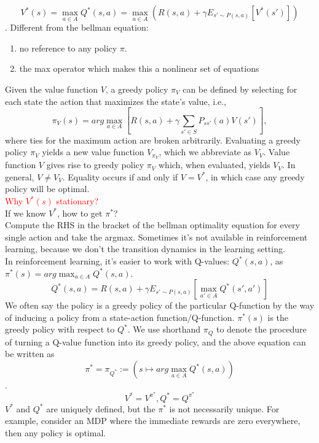 \documentclass{report}
\begin{document}
\begin{equation}\label{eq3}
    V^*(s)=\max_{a\in A}Q^*(s,a)=\max_{a\in A}(R(s,a)+\gamma E_{s'\sim P(s,a)}[V^*(s')])
\end{equation}
. Different from the bellman equation:
\begin{enumerate}
    \item no reference to any policy $\pi$.
    \item the max operator which makes this a nonlinear set of equations
\end{enumerate}
Given the value function $V$, a greedy policy $\pi_{V}$ can be defined by selecting for each state the action that maximizes the state's value, i.e.,\[
\pi_{V}(s)=arg\max_{a\in A}[R(s,a)+\gamma \sum_{s' \in S}P_{ss'}(a)V(s')],
\] where ties for the maximum action are broken arbitrarily. Evaluating a greedy policy $\pi_{V}$ yields a new value function $V_{\pi_{V}}$, which we abbreviate as $V_{V}$. Value function $V$ gives rise to greedy policy $\pi_{V}$ which, when evaluated, yields $V_{V}$. In general, $V \neq V_{V}$. Equality occurs if and only if $V=V^*$, in which case any greedy policy will be optimal.\\
\textcolor{red}{Why $V^*(s)$ stationary?} \\
If we know $V^*$, how to get $\pi^*$? \\
Compute the RHS in the bracket of the bellman optimality equation for every single action and take the argmax. Sometimes it's not available in reinforcement learning, because we don't the transition dynamics in the learning setting.\\
In reinforcement learning, it's easier to work with Q-values: $Q^*(s,a)$, as $\pi^*(s)=arg\max_{a\in A}Q^*(s,a)$. 
\begin{equation}\label{eq4}
    Q^*(s,a)=R(s,a)+\gamma E_{s'\sim P(s,a)}[\max_{a'\in A}Q^*(s',a')]
\end{equation}
We often say the policy is a greedy policy of the particular Q-function by the way of inducing a policy from a state-action function/Q-function. $\pi^*(s)$ is the greedy policy with respect to $Q^*$. We use shorthand $\pi_Q$ to denote the procedure of turning a Q-value function into its greedy policy, and the above equation can be written as \[\pi^*=\pi_{Q^*}:=(s \mapsto arg\max_{a\in A}Q^*(s,a))\].
\[
V^*=V^{\pi^*},
Q^*=Q^{\pi^*}
\]
$V^*$ and $Q^*$ are uniquely defined, but the $\pi^*$ is not necessarily unique. For example, consider an MDP where the immediate rewards are zero everywhere, then any policy is optimal. 
\end{document}
